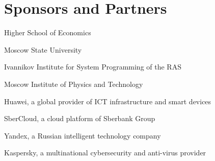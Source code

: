 \cleardoublepage
\thispagestyle{empty}
\section{Sponsors and Partners}

\newcommand\partner[1]{\newline}

\begin{multicols}{2}
\partner{partners/hse}
Higher School of Economics

Moscow State University

\columnbreak

\partner{partners/isp}
Ivannikov Institute for System Programming of the RAS

\partner{partners/mipt}
Moscow Institute of Physics and Technology
\end{multicols}

\begin{multicols}{2}
\partner{partners/huawei}
Huawei, a global provider of ICT infrastructure and smart devices

\partner{partners/sbercloud}
SberCloud, a cloud platform of Sberbank Group

\columnbreak

\partner{partners/yandex}
Yandex, a Russian intelligent technology company

\partner{partners/kaspersky}
Kaspersky, a multinational cybersecurity and anti-virus provider
\end{multicols}
